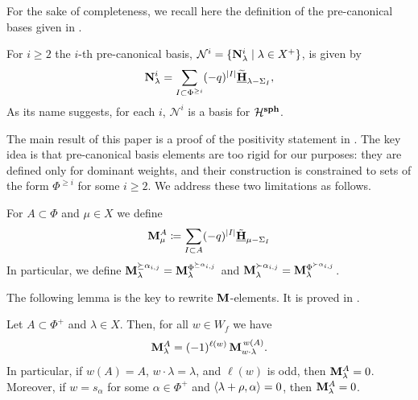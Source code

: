 For the sake of completeness, we recall here the definition of the pre-canonical bases given in . 

\begin{definition}\rm
   For $i\geq 2 $ the $i$-th pre-canonical basis, $\mathcal{N}^{i}=\{ \mathbf{N}_{\lambda }^i  \mid  \lambda \in X^{+} \}$, is given by 
\begin{equation}  \label{def: pre-canonical}
    \mathbf{N}_{\lambda}^{i} = \sum_{I\subset \Phi^{\geq i}} (-q)^{|I|} \widetilde{\underline{\mathbf{H}}}_{\lambda - \Sigma_I}, 
\end{equation}  
As its name suggests, for each $i$, $\mathcal{N}^{i}$ is a basis for $\mathcal{H}^{\textbf{sph}}$.
\end{definition}

The main result of this paper is a proof of the positivity statement in . 
The key idea is that pre-canonical basis elements are too rigid for our purposes: they are defined only for dominant weights, and their construction is constrained to  sets of the form $\Phi^{\ge i}$ for some $i\ge 2$. 
We address these two limitations as follows.

\begin{definition}\rm
      For $A\subset \Phi$ and $\mu \in X$ we define
      \begin{equation}
          \mathbf{M}_{\mu}^{A}\coloneqq \sum\limits_{I\subset A} (-q)^{\left| I \right|}\underline{\Tilde{\mathbf{H}}}_{\mu - \Sigma_{I}}
      \end{equation}
    In particular, we define $\mathbf{M}_{\lambda}^{\succeq \alpha_{i,j}}= \mathbf{M}_{\lambda}^{\Phi^{\succeq \alpha_{i,j}}}$ and  $\mathbf{M}_{\lambda}^{\succ \alpha_{i,j}}= \mathbf{M}_{\lambda}^{\Phi^{\succ \alpha_{i,j}}}$.
\end{definition}


The following lemma is the key to rewrite $\mathbf{M}$-elements.  It is proved in \cite[Proposition 4.3]{LPP}.


\begin{lemma}\rm\label{lem: weyl group over M elements}
Let $A\subset \Phi^+$ and $\lambda\in X$. Then, for all $w\in W_f$ we have 
\begin{equation}\label{eq: lemma act on M-elements}
  \mathbf{M}_{\lambda}^{A} = (-1)^{\ell(w)}\,\mathbf{M}_{w\cdot \lambda}^{\,w(A)}.
\end{equation}
In particular, if $w(A)=A$, $w\cdot \lambda=\lambda$, and $\ell(w)$ is odd, then $\mathbf{M}_{\lambda}^{A}=0$.
Moreover, if $w=s_{\alpha}$ for some $\alpha\in\Phi^{+}$ and $\langle \lambda+\rho , \alpha \rangle=0$, then $\mathbf{M}_{\lambda}^{A}=0$. 
\end{lemma}

